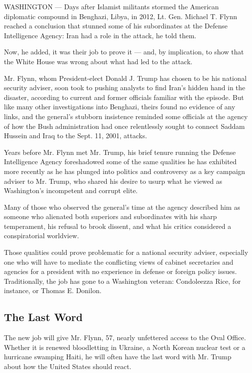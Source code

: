 WASHINGTON --- Days after Islamist militants stormed the American
diplomatic compound in Benghazi, Libya, in 2012, Lt. Gen. Michael T.
Flynn reached a conclusion that stunned some of his subordinates at the
Defense Intelligence Agency: Iran had a role in the attack, he told
them.

Now, he added, it was their job to prove it --- and, by implication, to
show that the White House was wrong about what had led to the attack.

Mr. Flynn, whom President-elect Donald J. Trump has chosen to be his
national security adviser, soon took to pushing analysts to find Iran's
hidden hand in the disaster, according to current and former officials
familiar with the episode. But like many other investigations into
Benghazi, theirs found no evidence of any links, and the general's
stubborn insistence reminded some officials at the agency of how the
Bush administration had once relentlessly sought to connect Saddam
Hussein and Iraq to the Sept. 11, 2001, attacks.

Years before Mr. Flynn met Mr. Trump, his brief tenure running the
Defense Intelligence Agency foreshadowed some of the same qualities he
has exhibited more recently as he has plunged into politics and
controversy as a key campaign adviser to Mr. Trump, who shared his
desire to usurp what he viewed as Washington's incompetent and corrupt
elite.

Many of those who observed the general's time at the agency described
him as someone who alienated both superiors and subordinates with his
sharp temperament, his refusal to brook dissent, and what his critics
considered a conspiratorial worldview.

Those qualities could prove problematic for a national security adviser,
especially one who will have to mediate the conflicting views of cabinet
secretaries and agencies for a president with no experience in defense
or foreign policy issues. Traditionally, the job has gone to a
Washington veteran: Condoleezza Rice, for instance, or Thomas E.
Donilon.

\hypertarget{the-last-word}{%
\subsection{The Last Word}\label{the-last-word}}

The new job will give Mr. Flynn, 57, nearly unfettered access to the
Oval Office. Whether it is renewed bloodletting in Ukraine, a North
Korean nuclear test or a hurricane swamping Haiti, he will often have
the last word with Mr. Trump about how the United States should react.

